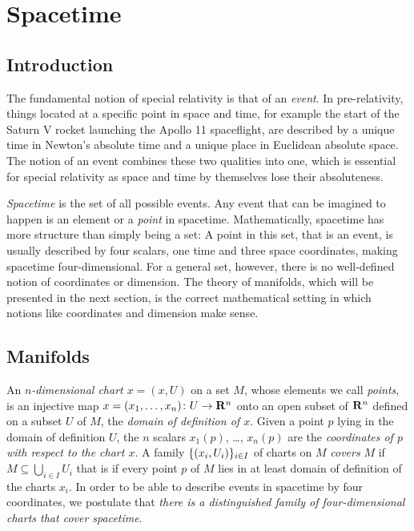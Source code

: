 \chapter{Spacetime}

\section{Introduction}

The fundamental notion of special relativity is that of an \emph{event}.
In pre-relativity, things located at a specific point in space and time,
for example the start of the Saturn V rocket launching the Apollo 11
spaceflight, are described by a unique time in Newton's absolute time and
a unique place in Euclidean absolute space. The notion of an event combines
these two qualities into one, which is essential for special relativity
as space and time by themselves lose their absoluteness.

\emph{Spacetime} is the set of all possible events. Any event that can
be imagined to happen is an element or a
\emph{point} in spacetime. Mathematically, spacetime has more
structure than simply being a set: A point in this set, that is an event, is
usually described by four scalars, one time and three space coordinates,
making spacetime four-dimensional. For a general set, however, there is no
well-defined notion of coordinates or dimension. The theory of manifolds, which
will be presented in the next section, is the correct mathematical setting in
which notions like coordinates and dimension make sense.

\section{Manifolds}
\label{sec:manifolds}

An \emph{$n$-dimensional chart $x = (x, U)$} on a set $M$, whose elements we call
\emph{points}, is an injective map
$x = (x_1, \dotsc, x_n)\colon U \to \mathbf{R}^n$ onto an open subset of $\mathbf{R}^n$ defined on a subset
$U$ of $M$, the \emph{domain of definition of $x$}. Given a point $p$ lying in the
domain of definition $U$, the $n$ scalars $x_1(p)$, \dots, $x_n(p)$ are the
\emph{coordinates of $p$ with respect to the chart $x$}. A
family $\lbrace(x_i, U_i)\rbrace_{i \in I}$ of charts on $M$ \emph{covers} $M$ if $M \subseteq
\bigcup_{i \in I} U_i$ that is if every point $p$ of $M$ lies in at least domain
of definition of the charts $x_i$. In order to be able to describe events in
spacetime by four coordinates, we postulate that \emph{there is a distinguished
family of four-dimensional charts that cover spacetime}.

